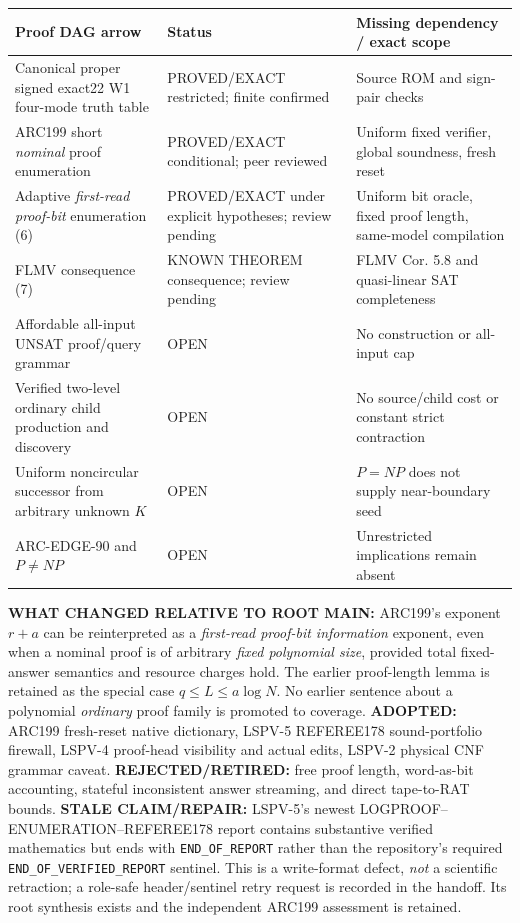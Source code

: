 \documentclass[11pt]{article}
\begin{document}
\begin{center}\small
\begin{tabularx}{.98\linewidth}{p{.45\linewidth}p{.20\linewidth}X}
\toprule
Proof DAG arrow & Status & Missing dependency / exact scope\\\midrule
Canonical proper signed exact22 W1 four-mode truth table &
PROVED/EXACT restricted; finite confirmed &
Source ROM and sign-pair checks\\
ARC199 short \emph{nominal} proof enumeration &
PROVED/EXACT conditional; peer reviewed &
Uniform fixed verifier, global soundness, fresh reset\\
Adaptive \emph{first-read proof-bit} enumeration (6) &
PROVED/EXACT under explicit hypotheses; review pending &
Uniform bit oracle, fixed proof length, same-model compilation\\
FLMV consequence (7) &
KNOWN THEOREM consequence; review pending &
FLMV Cor. 5.8 and quasi-linear SAT completeness\\
Affordable all-input UNSAT proof/query grammar &
OPEN & No construction or all-input cap\\
Verified two-level ordinary child production and discovery &
OPEN & No source/child cost or constant strict contraction\\
Uniform noncircular successor from arbitrary unknown $K$ &
OPEN & $P=NP$ does not supply near-boundary seed\\
ARC-EDGE-90 and $P\ne NP$ &
OPEN & Unrestricted implications remain absent\\
\bottomrule
\end{tabularx}
\end{center}

\noindent\textbf{WHAT CHANGED RELATIVE TO ROOT MAIN:}
ARC199's exponent $r+a$ can be reinterpreted as a
\emph{first-read proof-bit information} exponent,
even when a nominal proof is of arbitrary \emph{fixed
polynomial size}, provided total fixed-answer
semantics and resource charges hold.
The earlier proof-length lemma is retained as
the special case $q\le L\le a\log N$.
No earlier sentence about a polynomial \emph{ordinary}
proof family is promoted to coverage.
\textbf{ADOPTED:} ARC199 fresh-reset native dictionary,
LSPV-5 REFEREE178 sound-portfolio firewall,
LSPV-4 proof-head visibility and actual edits,
LSPV-2 physical CNF grammar caveat.
\textbf{REJECTED/RETIRED:} free proof length,
word-as-bit accounting, stateful inconsistent
answer streaming, and direct tape-to-RAT bounds.
\textbf{STALE CLAIM/REPAIR:} LSPV-5's newest
LOGPROOF--ENUMERATION--REFEREE178 report
contains substantive verified mathematics but
ends with \texttt{END\_OF\_REPORT} rather than
the repository's required
\texttt{END\_OF\_VERIFIED\_REPORT} sentinel.
This is a write-format defect, \emph{not} a scientific
retraction; a role-safe header/sentinel retry
request is recorded in the handoff. Its root
synthesis exists and the independent ARC199
assessment is retained.
\end{document}
